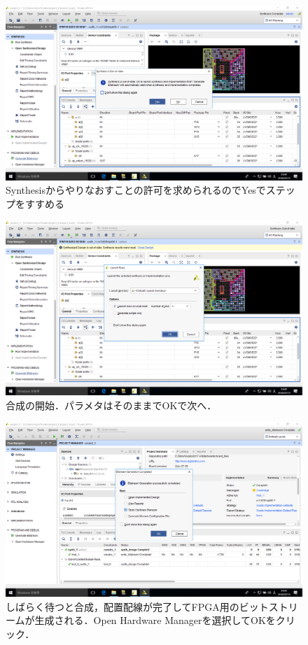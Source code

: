 \documentclass[a4paper,dvipdfmx]{jsarticle}
\begin{document}
 \begin{figure}[H]
  \begin{center}
   \includegraphics[width=.8\textwidth]{chapter08_figures/VirtualBox_Windows10_19_03_2018_23_40_06.png}
  \end{center}
  \caption{Synthesisからやりなおすことの許可を求められるのでYesでステップをすすめる}
 \end{figure}

 \begin{figure}[H]
  \begin{center}
   \includegraphics[width=.8\textwidth]{chapter08_figures/VirtualBox_Windows10_19_03_2018_23_40_11.png}
  \end{center}
  \caption{合成の開始．パラメタはそのままでOKで次へ．}
 \end{figure}

 \begin{figure}[H]
  \begin{center}
   \includegraphics[width=.8\textwidth]{chapter08_figures/VirtualBox_Windows10_19_03_2018_23_45_09.png}
  \end{center}
  \caption{しばらく待つと合成，配置配線が完了してFPGA用のビットストリームが生成される．Open Hardware Managerを選択してOKをクリック．}
 \end{figure}
\end{document}
